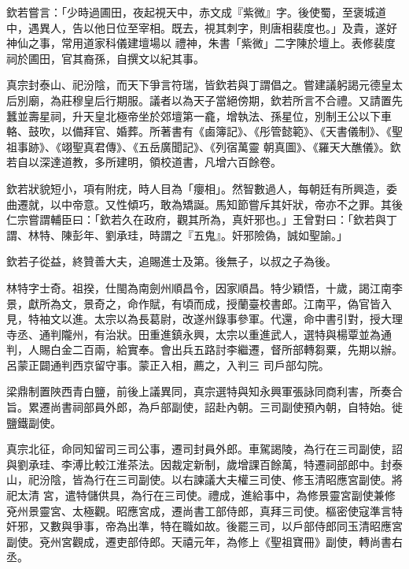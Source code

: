 \begin{pinyinscope}
 欽若嘗言：「少時過圃田，夜起視天中，赤文成『紫微』字。後使蜀，至褒城道中，遇異人，告以他日位至宰相。既去，視其刺字，則唐相裴度也。」及貴，遂好神仙之事，常用道家科儀建壇場以
 禮神，朱書「紫微」二字陳於壇上。表修裴度祠於圃田，官其裔孫，自撰文以紀其事。



 真宗封泰山、祀汾陰，而天下爭言符瑞，皆欽若與丁謂倡之。嘗建議躬謁元德皇太后別廟，為莊穆皇后行期服。議者以為天子當絕傍期，欽若所言不合禮。又請置先蠶並壽星祠，升天皇北極帝坐於郊壇第一龕，增執法、孫星位，別制王公以下車輅、鼓吹，以備拜官、婚葬。所著書有《鹵簿記》、《彤管懿範》、《天書儀制》、《聖祖事跡》、《翊聖真君傳》、《五岳廣聞記》、《列宿萬靈
 朝真圖》、《羅天大醮儀》。欽若自以深達道教，多所建明，領校道書，凡增六百餘卷。



 欽若狀貌短小，項有附疣，時人目為「癭相」。然智數過人，每朝廷有所興造，委曲遷就，以中帝意。又性傾巧，敢為矯誕。馬知節嘗斥其奸狀，帝亦不之罪。其後仁宗嘗謂輔臣曰：「欽若久在政府，觀其所為，真奸邪也。」王曾對曰：「欽若與丁謂、林特、陳彭年、劉承珪，時謂之『五鬼』。奸邪險偽，誠如聖諭。」



 欽若子從益，終贊善大夫，追賜進士及第。後無子，以叔之子為後。



 林特字士奇。祖揆，仕閩為南劍州順昌令，因家順昌。特少穎悟，十歲，謁江南李景，獻所為文，景奇之，命作賦，有頃而成，授蘭臺校書郎。江南平，偽官皆入見，特袖文以進。太宗以為長葛尉，改遂州錄事參軍。代還，命中書引對，授大理寺丞、通判隴州，有治狀。田重進鎮永興，太宗以重進武人，選特與楊覃並為通判，人賜白金二百兩，給實奉。會出兵五路討李繼遷，督所部轉芻粟，先期以辦。呂蒙正闢通判西京留守事。蒙正入相，薦之，入判三
 司戶部勾院。



 梁鼎制置陜西青白鹽，前後上議異同，真宗選特與知永興軍張詠同商利害，所奏合旨。累遷尚書祠部員外郎，為戶部副使，詔赴內朝。三司副使預內朝，自特始。徙鹽鐵副使。



 真宗北征，命同知留司三司公事，遷司封員外郎。車駕謁陵，為行在三司副使，詔與劉承珪、李溥比較江淮茶法。因裁定新制，歲增課百餘萬，特遷祠部郎中。封泰山，祀汾陰，皆為行在三司副使。以右諫議大夫權三司使、修玉清昭應宮副使。將祀太清
 宮，遣特儲供具，為行在三司使。禮成，進給事中，為修景靈宮副使兼修兗州景靈宮、太極觀。昭應宮成，遷尚書工部侍郎，真拜三司使。樞密使寇準言特奸邪，又數與爭事，帝為出準，特在職如故。後罷三司，以戶部侍郎同玉清昭應宮副使。兗州宮觀成，遷吏部侍郎。天禧元年，為修上《聖祖寶冊》副使，轉尚書右丞。




\end{pinyinscope}
